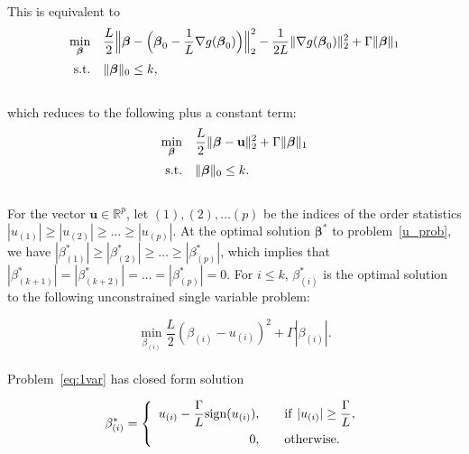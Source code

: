 \documentclass[12pt]{article}
\newcommand{\M}{\mathbf}
\newcommand{\MS}{\boldsymbol}
\newcommand{\R}{\mathbb{R}}
\newcommand{\1}{\mathds{1}}
\begin{document}
This is equivalent to
\begin{equation}
\begin{array}{rll}
  \min \limits_{\MS \beta} & \displaystyle \frac{L}{2}\Big\|\MS \beta - \Big(\MS \beta_0 - \frac{1}{L} \nabla g(\MS \beta_0)\Big) \Big\|_2^2 - \frac{1}{2L} \|\nabla g(\MS \beta_0) \|_2^2 + \Gamma \| \MS \beta \|_1 \vspace{5pt}\\
  \text{s.t.} & \| \MS \beta \|_0 \le k,
\end{array}
\end{equation}\\

which reduces to the following plus a constant term:
\begin{equation}
\label{u_prob}
\begin{array}{rll}
  \min \limits_{\MS \beta} & \displaystyle \frac{L}{2}\|\MS \beta - \M u \|_2^2 + \Gamma \| \MS \beta \|_1 \vspace{5pt}\\
  \text{s.t.} & \| \MS \beta \|_0 \le k.
\end{array}
\end{equation}\\

For the vector $\M u \in \R^p$, let $(1), (2), \ldots (p)$ be the indices of the order statistics $|u_{(1)}| \ge |u_{(2)}| \ge \ldots \ge |u_{(p)}|$.  At the optimal solution $\MS \beta^*$ to problem~\ref{u_prob}, we have $|\beta_{(1)}^*| \ge |\beta_{(2)}^*| \ge \ldots \ge |\beta_{(p)}^*|$, which implies that $|\beta_{(k+1)}^*| = |\beta_{(k + 2)}^*| = \ldots = |\beta_{(p)}^*| = 0$.  For $i \le k$, $\beta_{(i)}^*$ is the optimal solution to the following unconstrained single variable problem:

\begin{equation}
\label{eq:1var}
\min \limits_{\beta_{(i)}} \frac{L}{2}(\beta_{(i)} - u_{(i)})^2 + \Gamma |\beta_{(i)} |.
\end{equation}\\

Problem~\ref{eq:1var} has closed form solution

\begin{equation}
\beta_{(i)}^* = \left\{\begin{array}{rl} 
u_{(i)} - \displaystyle \frac{\Gamma}{L}\text{sign}(u_{(i)}), &~~~{\rm if}~|u_{(i)}| \ge \displaystyle \frac{\Gamma}{L}, \vspace{5pt}\\
0, &~~~\rm{otherwise.}
\end{array} \right.
\end{equation}\\
\end{document}
